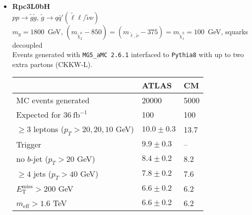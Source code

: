 \documentclass[10pt,fleqn]{article}
\newcommand{\met}{E^\mathrm{miss}_\mathrm{T}}
\newcommand{\meff}{m_\mathrm{eff}}
\begin{document}
\begin{itemize}
\item \textbf{Rpc3L0bH}\\ $ p p \to \tilde{g} \tilde{g} $, $\tilde{g} \to q \bar{q}'(\tilde{\ell}\ell/\tilde{\nu}\nu)$\\
 $m_{g} = 1800$~GeV, $(m_{\tilde{\chi}_2^0} - 850) = (m_{\tilde{\ell},\tilde{\nu}} - 375) = m_{\tilde{\chi}_1^0} = 100$~GeV, squarks decoupled\\
 Events generated with \texttt{MG5\_aMC 2.6.1} interfaced to \texttt{Pythia8} with up to two extra partons (CKKW-L).
 \begin{tabular}{l|p{3cm}|p{3cm}} \toprule
                                           &  ATLAS           & CM  \\ \midrule
 MC events generated                       &  20000          & 5000 \\ \midrule
 Expected for $36\ \mathrm{fb}^{-1}$       &  100            & 100  \\
 $\geq 3$ leptons ($p_T > 20, 20, 10$ GeV) & $10.0\pm 0.3$   &  13.7 \\
 Trigger                                   & $9.9 \pm 0.3$   &  --\\
 no $b$-jet ($p_T > 20$ GeV)               & $8.4 \pm 0.2$   &  8.2\\
 $\geq 4$ jets ($p_T > 40$ GeV)            & $7.8 \pm 0.2$   &  7.6\\
 $\met  > 200$ GeV                         & $6.6 \pm 0.2$   &  6.2\\
 $\meff > 1.6$ TeV                         & $6.6\pm  0.2$   &  6.2\\   \bottomrule
 \end{tabular}     
 

\end{itemize}
\end{document}
